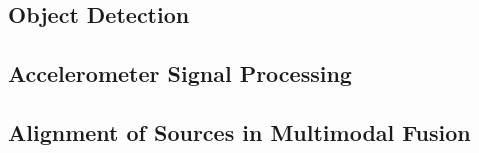 \subsection{Object Detection}


\subsection{Accelerometer Signal Processing}


\subsection{Alignment of Sources in Multimodal Fusion}